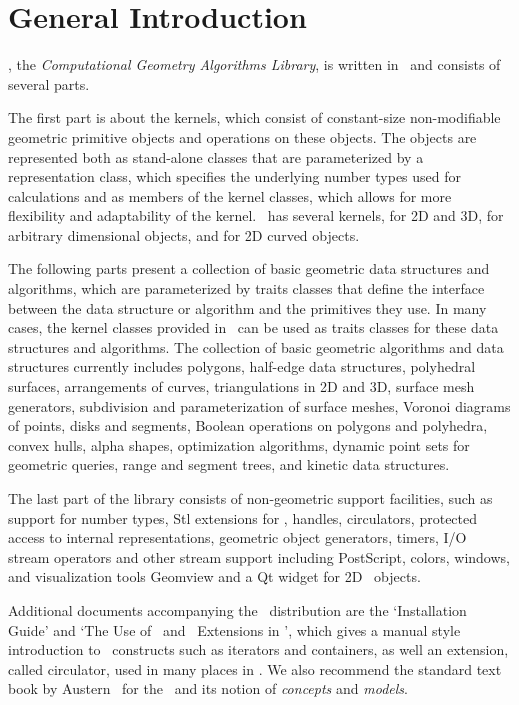 
\chapter{General Introduction}

\cgal, the {\em Computational Geometry Algorithms Library}, is written in 
\CC\ and consists of several parts.

The first part is about the kernels, which consist of constant-size non-modifiable 
geometric primitive objects and operations on these objects. 
The objects are represented both as stand-alone classes that are
parameterized by a representation class, which specifies
the underlying number types used for calculations and as members of the
kernel classes, which allows for more flexibility and adaptability of the 
kernel.  \cgal\ has several kernels, for 2D and 3D, for arbitrary dimensional
objects, and for 2D curved objects.

The following parts present a collection of basic geometric data structures and
algorithms, which are parameterized by traits classes that define the 
interface between the data structure or algorithm and the primitives they use.
In many cases, the kernel classes provided in \cgal\ can be used as traits
classes for these data structures and algorithms.
The collection of basic geometric algorithms and data structures
currently includes polygons, half-edge data structures, polyhedral surfaces, 
arrangements of curves, triangulations in 2D and 3D,  surface mesh
generators, subdivision and parameterization of surface meshes,
Voronoi diagrams of points, disks and segments, Boolean operations on polygons and polyhedra,
convex hulls, alpha shapes, optimization algorithms, dynamic
point sets for geometric queries,  range and segment trees, and 
kinetic data structures.

The last part of the library consists of non-geometric support
facilities, such as support for number types, {\sc Stl} extensions for
\cgal, handles, circulators, protected access to internal
representations, geometric object generators, timers, I/O stream
operators and other stream support including PostScript, colors,
windows, and visualization tools Geomview and a Qt widget for
2D \cgal\ objects.

Additional documents accompanying the \cgal\ distribution are the
`Installation Guide' and `The Use of \stl\ and \stl\ Extensions in
\cgal', which gives a manual style introduction to \stl\ constructs
such as iterators and containers, as well an extension, called
circulator, used in many places in \cgal. We also recommend the
standard text book by Austern~\cite{cgal:a-gps-98} for the \stl\ and
its notion of \emph{concepts} and \emph{models}.


